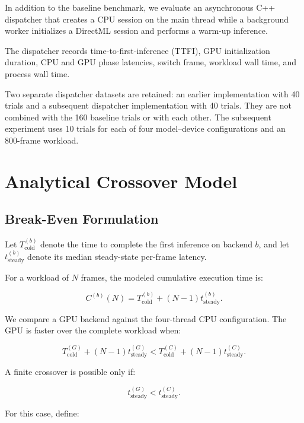 \documentclass[pdflatex,sn-mathphys-num]{sn-jnl}
\begin{document}
In addition to the baseline benchmark, we evaluate an asynchronous C++ dispatcher that creates a CPU session on the main thread while a background worker initializes a DirectML session and performs a warm-up inference.

The dispatcher records time-to-first-inference (TTFI), GPU initialization duration, CPU and GPU phase latencies, switch frame, workload wall time, and process wall time.

Two separate dispatcher datasets are retained: an earlier implementation with 40 trials and a subsequent dispatcher implementation with 40 trials. They are not combined with the 160 baseline trials or with each other. The subsequent experiment uses 10 trials for each of four model--device configurations and an 800-frame workload.

\section{Analytical Crossover Model}

\subsection{Break-Even Formulation}

Let $T_{\mathrm{cold}}^{(b)}$ denote the time to complete the first inference on backend $b$, and let $t_{\mathrm{steady}}^{(b)}$ denote its median steady-state per-frame latency.

For a workload of $N$ frames, the modeled cumulative execution time is:

\begin{equation}
C^{(b)}(N) =
T_{\mathrm{cold}}^{(b)}
+
(N-1)t_{\mathrm{steady}}^{(b)}.
\end{equation}

We compare a GPU backend against the four-thread CPU configuration. The GPU is faster over the complete workload when:

\begin{equation}
T_{\mathrm{cold}}^{(G)}
+
(N-1)t_{\mathrm{steady}}^{(G)}
<
T_{\mathrm{cold}}^{(C)}
+
(N-1)t_{\mathrm{steady}}^{(C)}.
\end{equation}

A finite crossover is possible only if:

\begin{equation}
t_{\mathrm{steady}}^{(G)}
<
t_{\mathrm{steady}}^{(C)}.
\end{equation}

For this case, define:
\end{document}
